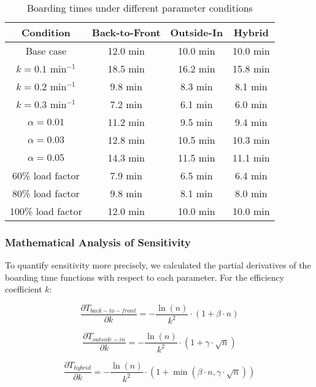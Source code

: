 \begin{table}[h]
\centering
\begin{tabular}{|c|c|c|c|}
\hline
\textbf{Condition} & \textbf{Back-to-Front} & \textbf{Outside-In} & \textbf{Hybrid} \\
\hline
Base case & 12.0 min & 10.0 min & 10.0 min \\
\hline
$k = 0.1$ min$^{-1}$ & 18.5 min & 16.2 min & 15.8 min \\
\hline
$k = 0.2$ min$^{-1}$ & 9.8 min & 8.3 min & 8.1 min \\
\hline
$k = 0.3$ min$^{-1}$ & 7.2 min & 6.1 min & 6.0 min \\
\hline
$\alpha = 0.01$ & 11.2 min & 9.5 min & 9.4 min \\
\hline
$\alpha = 0.03$ & 12.8 min & 10.5 min & 10.3 min \\
\hline
$\alpha = 0.05$ & 14.3 min & 11.5 min & 11.1 min \\
\hline
60\% load factor & 7.9 min & 6.5 min & 6.4 min \\
\hline
80\% load factor & 9.8 min & 8.1 min & 8.0 min \\
\hline
100\% load factor & 12.0 min & 10.0 min & 10.0 min \\
\hline
\end{tabular}
\caption{Boarding times under different parameter conditions}
\label{tab:sensitivity}
\end{table}

\subsubsection{Mathematical Analysis of Sensitivity}

To quantify sensitivity more precisely, we calculated the partial derivatives of the boarding time functions with respect to each parameter. For the efficiency coefficient $k$:

\begin{equation}
\frac{\partial T_{back-to-front}}{\partial k} = -\frac{\ln(n)}{k^2} \cdot (1 + \beta \cdot n)
\end{equation}

\begin{equation}
\frac{\partial T_{outside-in}}{\partial k} = -\frac{\ln(n)}{k^2} \cdot (1 + \gamma \cdot \sqrt{n})
\end{equation}

\begin{equation}
\frac{\partial T_{hybrid}}{\partial k} = -\frac{\ln(n)}{k^2} \cdot (1 + \min(\beta \cdot n, \gamma \cdot \sqrt{n}))
\end{equation}

